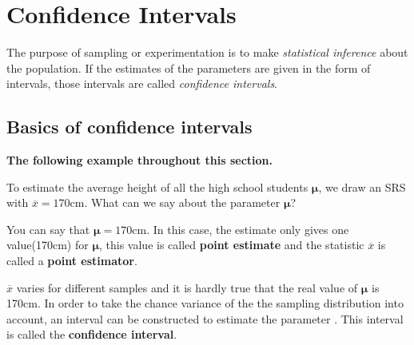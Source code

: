 \documentclass[a4paper, 12pt,twoside]{book}
\begin{document}
\pagestyle{fancy}
\fancyhf{}
\renewcommand{\chaptermark}[1]{ \markboth{#1}{} }
\fancyhead[CE,CO]{\leftmark}
\fancyfoot[LE,RO]{\thepage}

\chapter{Confidence Intervals}
The purpose of sampling or experimentation is to make \textit{statistical inference} about the population. If the estimates of the parameters are given in the form of intervals, those intervals are called \textit{confidence intervals}.
\newpage

\section{Basics of confidence intervals}
\textbf{The following example throughout this section.}\vspace{0.3cm}

 To estimate the average height of all the high school students $\mathbf{\mu}$, we draw an SRS with $\overline{x} = 170$cm. What can we say about the parameter  $\mathbf{\mu}$?\vspace{0.3cm}
 
 You can say that $\mathbf{\mu} = 170$cm. In this case, the estimate only gives one value(170cm) for $\mathbf{\mu}$, this value is called \textbf{point estimate} and the statistic $\overline{x}$ is called a \textbf{point estimator}. \vspace{0.3cm}

$\overline{x}$ varies for different samples and it is hardly true that the real value of $\mathbf{\mu}$ is 170cm. In order to  take the chance variance of the the sampling distribution into account, an interval can be constructed to estimate the parameter . This interval is called the \textbf{confidence interval}.\vspace{0.3cm}
\end{document}
